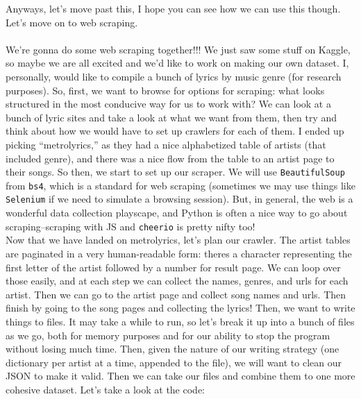 \documentclass[12pt]{article}
\begin{document}
Anyways, let's move past this, I hope you can see how we can use this though. Let's move on to web scraping.\\

\\

We're gonna do some web scraping together!!! We just saw some stuff on Kaggle, so maybe we are all excited and we'd like to work on making our own dataset. I, personally, would like to compile a bunch of lyrics by music genre (for research purposes). So, first, we want to browse for options for scraping: what looks structured in the most conducive way for us to work with? We can look at a bunch of lyric sites and take a look at what we want from them, then try and think about how we would have to set up crawlers for each of them. I ended up picking ``metrolyrics,'' as they had a nice alphabetized table of artists (that included genre), and there was a nice flow from the table to an artist page to their songs. So then, we start to set up our scraper. We will use \texttt{BeautifulSoup} from \texttt{bs4}, which is a standard for web scraping (sometimes we may use things like \texttt{Selenium} if we need to simulate a browsing session). But, in general, the web is a wonderful data collection playscape, and Python is often a nice way to go about scraping--scraping with JS and \texttt{cheerio} is pretty nifty too!\\
Now that we have landed on metrolyrics, let's plan our crawler. The artist tables are paginated in a very human-readable form: theres a character representing the first letter of the artist followed by a number for result page. We can loop over those easily, and at each step we can collect the names, genres, and urls for each artist. Then we can go to the artist page and collect song names and urls. Then finish by going to the song pages and collecting the lyrics! Then, we want to write things to files. It may take a while to run, so let's break it up into a bunch of files as we go, both for memory purposes and for our ability to stop the program without losing much time. Then, given the nature of our writing strategy (one dictionary per artist at a time, appended to the file), we will want to clean our JSON to make it valid. Then we can take our files and combine them to one more cohesive dataset. Let's take a look at the code:\\
\end{document}
